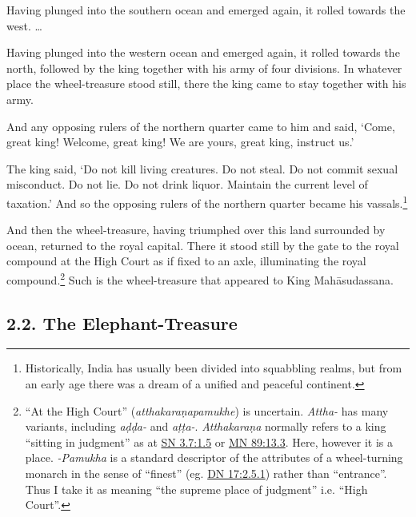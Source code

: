 \documentclass[12pt,openany]{book}%
\begin{document}
Having plunged into the southern ocean and emerged again, it rolled towards the west. … 

Having plunged into the western ocean and emerged again, it rolled towards the north, followed by the king together with his army of four divisions. In whatever place the wheel-treasure stood still, there the king came to stay together with his army. 

And any opposing rulers of the northern quarter came to him and said, ‘Come, great king! Welcome, great king! We are yours, great king, instruct us.’ 

The king said, ‘Do not kill living creatures. Do not steal. Do not commit sexual misconduct. Do not lie. Do not drink liquor. Maintain the current level of taxation.’ And so the opposing rulers of the northern quarter became his vassals.\footnote{Historically, India has usually been divided into squabbling realms, but from an early age there was a dream of a unified and peaceful continent. } 

And then the wheel-treasure, having triumphed over this land surrounded by ocean, returned to the royal capital. There it stood still by the gate to the royal compound at the High Court as if fixed to an axle, illuminating the royal compound.\footnote{“At the High Court” (\textit{\textsanskrit{atthakaraṇapamukhe}}) is uncertain. \textit{Attha-} has many variants, including \textit{\textsanskrit{aḍḍa}-} and \textit{\textsanskrit{aṭṭa}-}. \textit{\textsanskrit{Atthakaraṇa}} normally refers to a king “sitting in judgment” as at \href{https://suttacentral.net/sn3.7/en/sujato\#1.5}{SN 3.7:1.5} or \href{https://suttacentral.net/mn89/en/sujato\#13.3}{MN 89:13.3}. Here, however it is a place. \textit{-Pamukha} is a standard descriptor of the attributes of a wheel-turning monarch in the sense of “finest” (eg. \href{https://suttacentral.net/dn17/en/sujato\#2.5.1}{DN 17:2.5.1}) rather than “entrance”. Thus I take it as meaning “the supreme place of judgment” i.e. “High Court”. } Such is the wheel-treasure that appeared to King \textsanskrit{Mahāsudassana}. 

\subsection*{2.2. The Elephant-Treasure }
\end{document}
